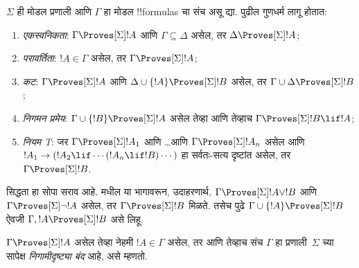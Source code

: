 \documentclass[../../../include/open-logic-section]{subfiles}
\begin{document}


\begin{prop}
  $\Sigma$ ही मोडल प्रणाली आणि $\Gamma$ हा मोडल
  !!{formula}s चा संच असू द्या. पुढील गुणधर्म लागू होतात:
  \begin{enumerate}
  \item{} \emph{एकस्वनिकता}:
    $\Gamma \Proves[\Sigma] !A$ आणि
    $\Gamma \subseteq \Delta$ असेल, तर
    $\Delta \Proves[\Sigma] !A$;
  \item{}
    \emph{परावर्तिता}: $!A \in \Gamma$ असेल, तर $\Gamma
    \Proves[\Sigma] !A$;
  \item{} \emph{कट}: $\Gamma
    \Proves[\Sigma] !A$ आणि $\Delta \cup \{!A\} \Proves[\Sigma] !B$
    असेल, तर $\Gamma \cup \Delta \Proves[\Sigma] !B$;
  \item{} \emph{निगमन प्रमेय}: $\Gamma \cup \{!B\}
    \Proves[\Sigma] !A$ असेल तेव्हा आणि तेव्हाच $\Gamma \Proves[\Sigma] !B \lif
      !A$;
  \item {} \emph{नियम T}: जर
    $\Gamma \Proves[\Sigma] !A_1$ आणि \dots आणि $\Gamma
    \Proves[\Sigma] !A_n$ असेल आणि $!A_1 \to (!A_2 \lif \cdots (!A_n \lif
    !B)\cdots)$ हा सर्वतः-सत्य दृष्टांत असेल, तर $\Gamma
    \Proves[\Sigma] !B$.
  \end{enumerate}
\end{prop}

सिद्धता हा सोपा सराव आहे.
 मधील
 या भागावरून,
उदाहरणार्थ, $\Gamma \Proves[\Sigma] !A \lor !B$
आणि $\Gamma \Proves[\Sigma] \lnot !A$ असेल, तर
$\Gamma \Proves[\Sigma] !B$ मिळते.
तसेच पुढे $\Gamma \cup \{ !A\} \Proves[\Sigma] !B$
ऐवजी $\Gamma, !A \Proves[\Sigma] !B$ असे लिहू.

\begin{defn}
  $\Gamma \Proves[\Sigma] !A$ असेल तेव्हा नेहमी
  $!A \in \Gamma$ असेल, तर आणि तेव्हाच संच
  $\Gamma$ हा प्रणाली~$\Sigma$ च्या सापेक्ष
  \emph{निगामीदृष्ट्या बंद} आहे, असे म्हणतो.
\end{defn}
\end{document}
